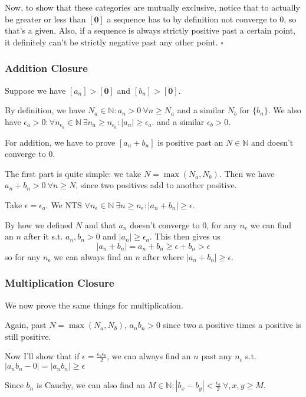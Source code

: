 \documentclass[12pt]{article}
\newcommand{\N}{\mathbb{N}}
\begin{document}
Now, to show that these categories are mutually exclusive,
notice that to actually be greater or less than $[\mathbf{0}]$
a sequence has to by definition not converge to $0$, so that's a given.
Also, if a sequence is always strictly positive past a certain point,
it definitely can't be strictly negative past any other point. $\square$

\pagebreak

\subsubsection{Addition Closure}

Suppose we have $[a_n] > [\mathbf{0}]$ and $[b_n] > [\mathbf{0}]$.

By definition, we have $N_a \in \N: a_n > 0\ \forall n \ge N_a$ and a similar $N_b$ for $\{b_n\}$.
We also have $\epsilon_a > 0: \forall n_{\epsilon_a} \in \N\ \exists n_a \ge n_{\epsilon_a}: |a_n| \ge \epsilon_a$.
and a similar $\epsilon_b > 0$.

For addition, we have to prove $[a_n+b_n]$ is positive past an $N \in \N$ and doesn't converge to $0$.

The first part is quite simple: we take $N=\max(N_a, N_b)$.
Then we have $a_n+b_n > 0\ \forall n \ge N$, since two positives add to another positive.

Take $\epsilon = \epsilon_a$.
We NTS $\forall n_\epsilon \in \N\ \exists n \ge n_\epsilon: |a_n+b_n| \ge \epsilon$.

By how we defined $N$ and that $a_n$ doesn't converge to $0$,
for any $n_\epsilon$ we can find an $n$ after it s.t. $a_n, b_n > 0$ and $|a_n| \ge \epsilon_a$.
This then gives us
\[|a_n+b_n|=a_n+b_n \ge \epsilon + b_n > \epsilon\]
so for any $n_\epsilon$ we can always find an $n$ after where $|a_n+b_n| \ge \epsilon$.

\subsubsection{Multiplication Closure}

We now prove the same things for multiplication.

Again, past $N = \max(N_a, N_b)$, $a_nb_n > 0$
since two a positive times a positive is still positive.

Now I'll show that if $\epsilon=\frac{\epsilon_a\epsilon_b}{2}$,
we can always find an $n$ past any $n_\epsilon$ s.t. $|a_nb_n-0|=|a_nb_n| \ge \epsilon$

Since $b_n$ is Cauchy, we can also find an $M \in \N: |b_x-b_y| < \frac{\epsilon_b}{2}\ \forall, x, y \ge M$.
\end{document}
